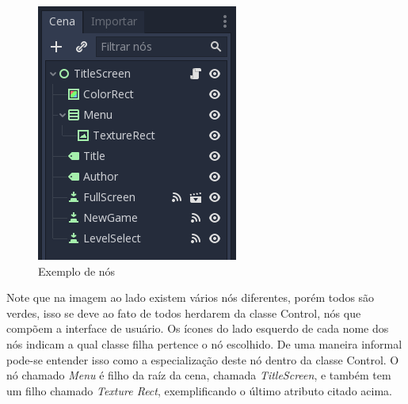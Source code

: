 \begin{minipage}[c]{0.5\textwidth}
    \begin{figure}[H]
        \includegraphics[width=\textwidth]{../figuras/exemplo_noh.png}
        \caption{Exemplo de nós}
    \end{figure}
\end{minipage}%
\begin{minipage}{0.05\textwidth}
    \hfill
\end{minipage}%
\begin{minipage}[c]{0.4\textwidth}
    Note que na imagem ao lado existem vários nós diferentes, porém todos são
    verdes, isso se deve ao fato de todos herdarem da classe Control, nós
    que compõem a interface de usuário.
    \hfill\newline\hfill
    Os ícones do lado esquerdo de cada
    nome dos nós indicam a qual classe filha pertence o nó escolhido. De uma
    maneira informal pode-se entender isso como a especialização deste nó 
    dentro da classe Control.
    \hfill\newline\hfill
    O nó chamado \textit{Menu} é filho da raíz da cena, chamada 
    \textit{TitleScreen}, e também tem um filho chamado \textit{Texture Rect},
    exemplificando o último atributo citado acima.
\end{minipage}

